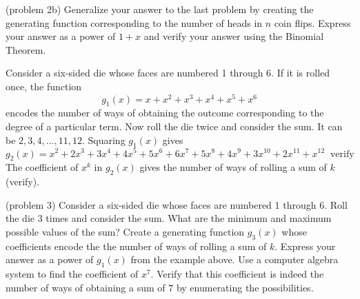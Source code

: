 \documentclass[handout]{ximera}
\begin{document}
\begin{problem}(problem 2b)
Generalize your answer to the last problem by creating the generating function corresponding to the 
number of heads in $n$ coin flips.
Express your answer as a power of $1+x$ and verify your answer using the Binomial Theorem.
\end{problem}
 

\begin{example}[example 3]
Consider a six-sided die whose faces are numbered 1 through 6. If it is rolled once, the function
\[
g_1(x) = x + x^2 + x^3 + x^4 + x^5 + x^6
\]
encodes the number of ways of obtaining the outcome corresponding to the degree of a particular term.
Now roll the die twice and consider the sum. It can be $2, 3, 4, ..., 11, 12$. Squaring $g_1(x)$ gives
\[
g_2(x) = x^2 + 2x^3 + 3x^4 + 4x^5 + 5x^6 + 6x^7 + 5x^8 + 4x^9+ 3x^{10} + 2x^{11} + x^{12} \;\; \text{verify}
\]
The coefficient of $x^k$ in $g_2(x)$ gives the number of ways of rolling a sum of $k$ (verify).
\end{example}

\begin{problem}(problem 3)
Consider a six-sided die whose faces are numbered 1 through 6. Roll the die 3 times and consider the sum.
What are the minimum and maximum possible values of the sum? Create a generating function $g_3(x)$ whose coefficients 
encode the the number of ways of rolling a sum of $k$.  Express your answer as a power of $g_1(x)$ from the example above.
Use a computer algebra system to find the coefficient of $x^7$. Verify that this coefficient is 
indeed the number of ways of obtaining a sum of $7$ by enumerating the possibilities.
\end{problem}
\end{document}
